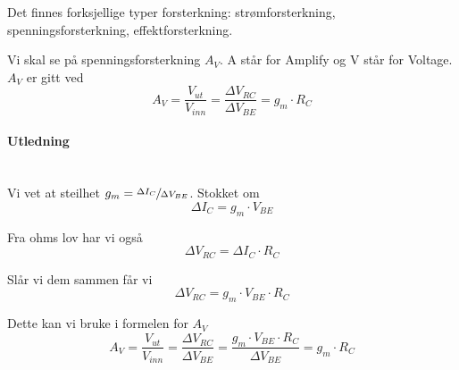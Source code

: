 Det finnes forksjellige typer forsterkning:
strømforsterkning, spenningsforsterkning, effektforsterkning.

Vi skal se på spenningsforsterkning $A_V$.
A står for Amplify og V står for Voltage.
$A_V$ er gitt ved
$$A_V = \frac{V_{ut}}{V_{inn}} = \frac{\Delta V_{RC}}{\Delta V_{BE}}
= g_m \cdot R_C$$

\paragraph{Utledning} \mbox{} \\
Vi vet at steilhet $g_m = \sfrac{\Delta I_C}{\Delta V_{BE}}$.
Stokket om
$$\Delta I_C = g_m \cdot V_{BE}$$

Fra ohms lov har vi også
$$\Delta V_{RC} = \Delta I_C \cdot R_C$$

Slår vi dem sammen får vi
$$\Delta V_{RC} = g_m \cdot V_{BE} \cdot R_C$$

Dette kan vi bruke i formelen for $A_V$
$$A_V = \frac{V_{ut}}{V_{inn}}
= \frac{\Delta V_{RC}}{\Delta V_{BE}}
= \frac{g_m \cdot V_{BE} \cdot R_C}{\Delta V_{BE}}
= g_m \cdot R_C$$
